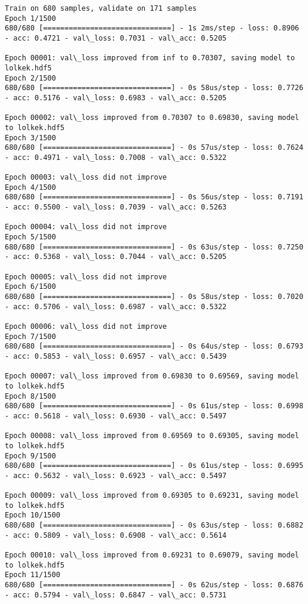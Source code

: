 \documentclass[11pt]{article}
\begin{document}
    \begin{Verbatim}[commandchars=\\\{\}]
Train on 680 samples, validate on 171 samples
Epoch 1/1500
680/680 [==============================] - 1s 2ms/step - loss: 0.8906 - acc: 0.4721 - val\_loss: 0.7031 - val\_acc: 0.5205

Epoch 00001: val\_loss improved from inf to 0.70307, saving model to lolkek.hdf5
Epoch 2/1500
680/680 [==============================] - 0s 58us/step - loss: 0.7726 - acc: 0.5176 - val\_loss: 0.6983 - val\_acc: 0.5205

Epoch 00002: val\_loss improved from 0.70307 to 0.69830, saving model to lolkek.hdf5
Epoch 3/1500
680/680 [==============================] - 0s 57us/step - loss: 0.7624 - acc: 0.4971 - val\_loss: 0.7008 - val\_acc: 0.5322

Epoch 00003: val\_loss did not improve
Epoch 4/1500
680/680 [==============================] - 0s 56us/step - loss: 0.7191 - acc: 0.5500 - val\_loss: 0.7039 - val\_acc: 0.5263

Epoch 00004: val\_loss did not improve
Epoch 5/1500
680/680 [==============================] - 0s 63us/step - loss: 0.7250 - acc: 0.5368 - val\_loss: 0.7044 - val\_acc: 0.5205

Epoch 00005: val\_loss did not improve
Epoch 6/1500
680/680 [==============================] - 0s 58us/step - loss: 0.7020 - acc: 0.5706 - val\_loss: 0.6987 - val\_acc: 0.5322

Epoch 00006: val\_loss did not improve
Epoch 7/1500
680/680 [==============================] - 0s 64us/step - loss: 0.6793 - acc: 0.5853 - val\_loss: 0.6957 - val\_acc: 0.5439

Epoch 00007: val\_loss improved from 0.69830 to 0.69569, saving model to lolkek.hdf5
Epoch 8/1500
680/680 [==============================] - 0s 61us/step - loss: 0.6998 - acc: 0.5618 - val\_loss: 0.6930 - val\_acc: 0.5497

Epoch 00008: val\_loss improved from 0.69569 to 0.69305, saving model to lolkek.hdf5
Epoch 9/1500
680/680 [==============================] - 0s 61us/step - loss: 0.6995 - acc: 0.5632 - val\_loss: 0.6923 - val\_acc: 0.5497

Epoch 00009: val\_loss improved from 0.69305 to 0.69231, saving model to lolkek.hdf5
Epoch 10/1500
680/680 [==============================] - 0s 63us/step - loss: 0.6882 - acc: 0.5809 - val\_loss: 0.6908 - val\_acc: 0.5614

Epoch 00010: val\_loss improved from 0.69231 to 0.69079, saving model to lolkek.hdf5
Epoch 11/1500
680/680 [==============================] - 0s 62us/step - loss: 0.6876 - acc: 0.5794 - val\_loss: 0.6847 - val\_acc: 0.5731


\end{Verbatim}
\end{document}
